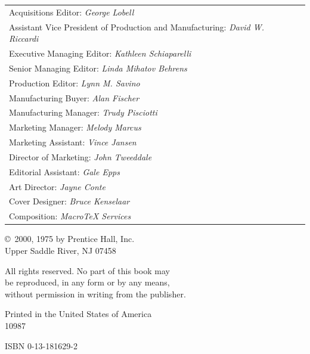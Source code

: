 \begin{flushleft}
\begin{tabular}{@{}l@{\hspace{0.5em}}l@{}}
Acquisitions Editor:  \textit{George Lobell} \\
Assistant Vice President of Production and Manufacturing: \textit{David W. Riccardi} \\
Executive Managing Editor:  \textit{Kathleen Schiaparelli} \\
Senior Managing Editor:  \textit{Linda Mihatov Behrens} \\
Production Editor:  \textit{Lynn M. Savino} \\
Manufacturing Buyer:  \textit{Alan Fischer} \\
Manufacturing Manager:  \textit{Trudy Pisciotti} \\
Marketing Manager:  \textit{Melody Marcus} \\
Marketing Assistant:  \textit{Vince Jansen} \\
Director of Marketing:  \textit{John Tweeddale} \\
Editorial Assistant:  \textit{Gale Epps} \\
Art Director:  \textit{Jayne Conte} \\
Cover Designer:  \textit{Bruce Kenselaar} \\
Composition:  \textit{MacroTeX Services} \\
\end{tabular}

\vspace{1.5\baselineskip}
\end{flushleft}

\begin{flushleft}
\copyright\ 2000, 1975 by Prentice Hall, Inc. \\
Upper Saddle River, NJ 07458

\vspace{1.5\baselineskip}

All rights reserved. No part of this book may \\
be reproduced, in any form or by any means, \\
without permission in writing from the publisher.

\vspace{1.5\baselineskip}

Printed in the United States of America \\
10\hspace{0.36cm}9\hspace{0.36cm}8\hspace{0.36cm}7

\vspace{1.5\baselineskip}
{\ttfamily
ISBN 0-13-181629-2}

\vspace{2\baselineskip}
\end{flushleft}

